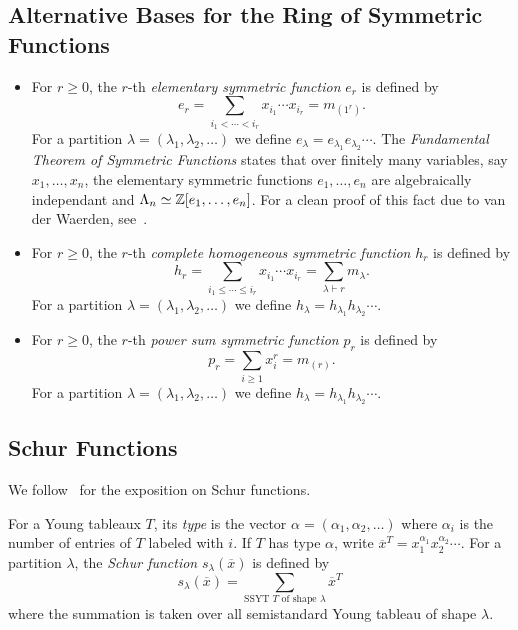 \documentclass[letterpaper]{article}
\begin{document}
\subsection{Alternative Bases for the Ring of Symmetric Functions}

\begin{defn}
  \begin{itemize}
    \item For $r \geq 0$, the $r$-th \emph{elementary symmetric function} $e_r$ is defined by
          \[
            e_r = \sum_{i_1 < \cdots < i_r} x_{i_1} \cdots x_{i_r} = m_{(1^r)}.
          \]
          For a partition $\lambda = (\lambda_1, \lambda_2, \ldots)$ we define $e_\lambda = e_{\lambda_1} e_{\lambda_2} \cdots$.
          The \emph{Fundamental Theorem of Symmetric Functions} states that over finitely many variables, say $x_1, \ldots, x_n$, the elementary symmetric functions $e_1, \ldots, e_n$ are algebraically independant and $\Lambda_n \simeq \mathbb{Z}[e_1, \ldots, e_n]$.
          For a clean proof of this fact due to van der Waerden, see~\cite[Theorem 1.1.1]{Stu08}.
    \item For $r \geq 0$, the $r$-th \emph{complete homogeneous symmetric function} $h_r$ is defined by
          \[
            h_r = \sum_{i_1 \leq \cdots \leq i_r} x_{i_1} \cdots x_{i_r} = \sum_{\lambda \vdash r} m_{\lambda}.
          \]
          For a partition $\lambda = (\lambda_1, \lambda_2, \ldots)$ we define $h_\lambda = h_{\lambda_1} h_{\lambda_2} \cdots$.
    \item For $r \geq 0$, the $r$-th \emph{power sum symmetric function} $p_r$ is defined by
          \[
            p_r = \sum_{i \geq 1} x_{i}^r = m_{(r)}.
          \]
          For a partition $\lambda = (\lambda_1, \lambda_2, \ldots)$ we define $h_\lambda = h_{\lambda_1} h_{\lambda_2} \cdots$.
  \end{itemize}
\end{defn}

\subsection{Schur Functions}

We follow~\cite[Chapter 7]{Sta23} for the exposition on Schur functions.

\begin{defn}
  For a Young tableaux $T$, its \emph{type} is the vector $\alpha = (\alpha_1, \alpha_2, \ldots)$ where $\alpha_i$ is the number of entries of $T$ labeled with $i$.
  If $T$ has type $\alpha$, write $\overline{x}^T = x_1^{\alpha_1} x_2^{\alpha_2} \cdots$.
  For a partition $\lambda$, the \emph{Schur function} $s_\lambda(\overline{x})$ is defined by
  \[
    s_\lambda(\overline{x}) = \sum_{\text{SSYT } T \text{ of shape } \lambda} \overline{x}^T
  \]
  where the summation is taken over all semistandard Young tableau of shape $\lambda$.
\end{defn}
\end{document}
